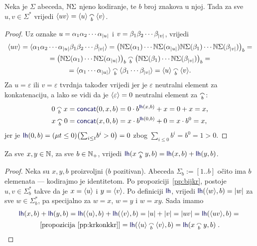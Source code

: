 \begin{propozicija}\label{pp:krkonkkr}
Neka je $\Sigma$ abeceda, ${\mathbb N}\Sigma$ njeno kodiranje, te $b$ broj znakova u njoj. Tada za sve $u,v\in\Sigma^*$ vrijedi
    $\kr{uv}=\kr u\conc b\kr v$.
\end{propozicija}
\begin{proof}
Uz oznake $u=\alpha_1\alpha_2\dotsm\alpha_{\lvert u\rvert}$ i $v=\beta_1\beta_2\dotsm\beta_{\lvert v\rvert}$, vrijedi
\begin{multline}
\kr{uv}=\kr{\alpha_1\alpha_2\dotsm\alpha_{\dulj u}\beta_1\beta_2\dotsm\beta_{\dulj v}}=\bigl(
\N\Sigma(\alpha_1)
\dotsm
\N\Sigma(\alpha_{\dulj u})
\N\Sigma(\beta_1)
\dotsm
\N\Sigma(\beta_{\dulj v})
\bigr)_b=\\
=\bigl(
\N\Sigma(\alpha_1)
\dotsm
\N\Sigma(\alpha_{\dulj u})
\bigr)_b\conc b\bigl(
\N\Sigma(\beta_1)
\dotsm
\N\Sigma(\beta_{\dulj v})
\bigr)_b=\\
=\kr{\alpha_1\dotsm\alpha_{\dulj u}}\conc b\kr{\beta_1\dotsm\beta_{\dulj v}}=\kr u\conc b\kr v\text.
\end{multline}
Za $u=\varepsilon$ ili $v=\varepsilon$ tvrdnja također vrijedi jer je $\varepsilon$ neutralni element za konkatenaciju, a lako se vidi da je $\langle\varepsilon\rangle=0$ neutralni element za $\conc b$:
\begin{align}
    0\conc bx&=\f{concat}(0,x,b)=0\cdot b^{\f{lh}(x,b)}+x=0+x=x\text,\\
    x\conc b0&=\f{concat}(x,0,b)=x\cdot b^{\f{lh}(0,b)}+0=x\cdot b^0=x\text,
\end{align}
jer je $\f{lh}(0,b)=(\mu t\le 0)\bigl(\sum_{i\le t}\!b^i>0\bigr)=0$ zbog $\sum_{i\le0}b^i=b^0=1>0$.
\end{proof}

\begin{korolar}\label{kor:lhkonk=lh+lh}
Za sve $x,y\in{\mathbb N}$, za sve $b\in{\mathbb N}_+$, vrijedi $\f{lh}(x\conc b y,b)=\f{lh}(x,b)+\f{lh}(y,b)$.
\end{korolar}
\begin{proof}
Neka su $x,y,b$ proizvoljni ($b$ pozitivan). Abeceda $\Sigma_b:=[1..b]$ očito ima $b$ elemenata --- kodirajmo je identitetom.
Po propoziciji~\ref{pp:bijkr}, postoje $u,v\in\Sigma_b^*$ takve da je $x=\langle u\rangle$ i $y=\langle v\rangle$. Po definiciji $\f{lh}$, vrijedi $\f{lh}(\kr w,b)=\dulj w$ za sve $w\in\Sigma_b^*$, pa specijalno za $w=x$, $w=y$ i $w=xy$. Sada imamo
\begin{multline}
    \f{lh}(x,b)+\f{lh}(y,b)=
    \f{lh}(\kr u,b)+\f{lh}(\kr v,b)=
    \dulj u+\dulj v=
    \dulj{uv}=
    \f{lh}(\kr{uv},b)={}\\
    \text{[propozicija \ref{pp:krkonkkr}]}{}=\f{lh}(\kr u\conc b\kr v,b)=
    \f{lh}(x\conc b y,b)\text{\qedhere\;.}
\end{multline}
\end{proof}

